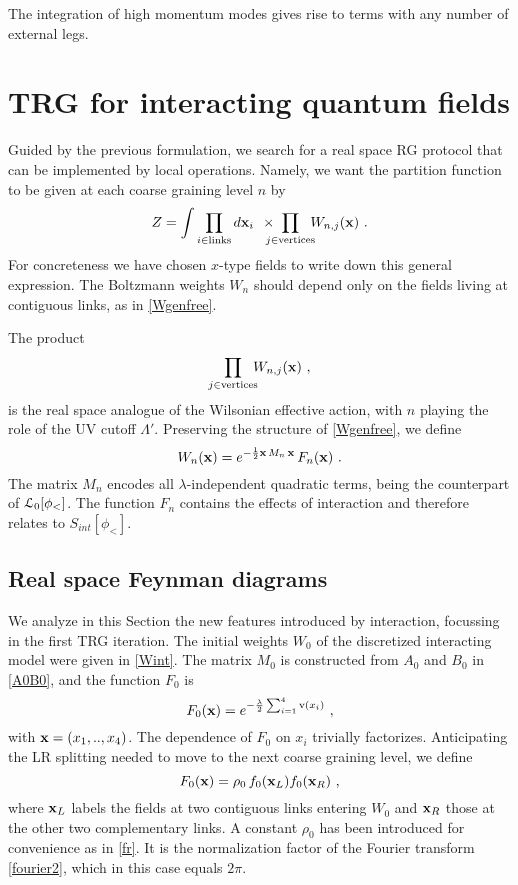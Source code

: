 \documentclass[a4paper,preprintnumbers,nofootinbib,twocolumn]{quantumarticle}
\newcommand{\be}{\begin{equation}} \newcommand{\ee}{\end{equation}}
\begin{document}
\noindent The integration of high momentum modes gives rise to terms with any number of external legs. 


\section{TRG for interacting quantum fields}

Guided by the previous formulation, we search for a real space RG protocol that can be implemented by local operations. Namely, we want 
the partition function to be given at each coarse graining level $n$ by
\be
Z=\int \prod_{i \in {\rm links}}  d {\bf x}_i \;\, \times \!\!\!\!\! \prod_{j \in {\rm vertices}} \!\!\! W_{n,j}({\bf x}) \ .
\ee
For concreteness we have chosen $x$-type fields to write down this general expression.
The Boltzmann weights $W_n$ should depend only on the fields living at contiguous links, as in \eqref{Wgenfree}.

The product 
\be
 \prod_{j \in {\rm vertices}} \!\!\! W_{n,j}({\bf x})  \ ,
\label{Zn}
\ee
is the real space analogue of the Wilsonian effective action, with $n$ playing the role
of the  UV cutoff $\Lambda'$. 
Preserving the structure of \eqref{Wgenfree}, we define
\be
W_n({\bf x})= e^{- {1 \over 2} {\bf x} \, M_n \, {\bf x}} \,  F_n({\bf x}) \ .
\label{WgenG}
\ee
The matrix $M_n$ encodes all $\lambda$-independent quadratic terms, being the counterpart of ${\cal L}_0[\phi_<]$.
The function $F_n$ contains the effects of interaction and therefore relates to $S_{int}[\phi_<]$. 



\subsection{Real space Feynman diagrams
\label{FD}}

We analyze in this Section the new features introduced by interaction, focussing in the first TRG iteration.
The initial weights $W_0$ of the discretized interacting model  were given in \eqref{Wint}. The matrix $M_0$ is constructed from $A_0$ and $B_0$ in \eqref{A0B0}, and the function $F_0$ is 
\be
F_0({\bf x})= e^{- {\lambda \over 2} \sum_{i=1}^4 {\rm v}(x_i) } \ ,
\ee
with ${\bf x}=(x_1,..,x_4)$. The dependence of $F_0$ on $x_i$ trivially factorizes.
Anticipating the LR splitting needed to move to the next coarse graining level, we define
\be
F_0({\bf x})= 
\rho_0 \, f_0({\bf x}_L)f_0({\bf x}_R)  \ ,
\label{F0}
\ee
where 
${\bf x}_L$ labels the fields at two contiguous links entering $W_0$ and ${\bf x}_R$ those at the other two complementary links. 
A constant $\rho_0$ has been introduced for convenience as in \eqref{fr}. It is the normalization factor of the Fourier transform \eqref{fourier2}, which in this case equals $2\pi$. 
\end{document}
